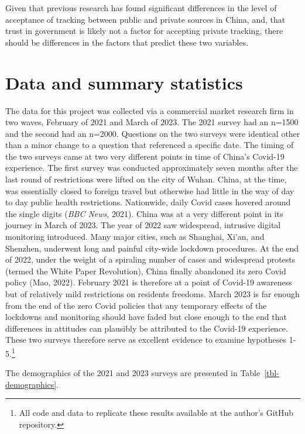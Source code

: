\documentclass[
  letterpaper,
  DIV=11,
  numbers=noendperiod]{scrartcl}
\begin{document}
Given that previous research has found significant differences in the
level of acceptance of tracking between public and private sources in
China, and, that trust in government is likely not a factor for
accepting private tracking, there should be differences in the factors
that predict these two variables.

\section{Data and summary statistics}\label{sec-datasummary}

The data for this project was collected via a commercial market research
firm in two waves, February of 2021 and March of 2023. The 2021 survey
had an n=1500 and the second had an n=2000. Questions on the two surveys
were identical other than a minor change to a question that referenced a
specific date. The timing of the two surveys came at two very different
points in time of China's Covid-19 experience. The first survey was
conducted approximately seven months after the last round of
restrictions were lifted on the city of Wuhan. China, at the time, was
essentially closed to foreign travel but otherwise had little in the way
of day to day public health restrictions. Nationwide, daily Covid cases
hovered around the single digits (\emph{BBC News}, 2021). China was at a
very different point in its journey in March of 2023. The year of 2022
saw widespread, intrusive digital monitoring introduced. Many major
cities, such as Shanghai, Xi'an, and Shenzhen, underwent long and
painful city-wide lockdown procedures. At the end of 2022, under the
weight of a spiraling number of cases and widespread protests (termed
the White Paper Revolution), China finally abandoned its zero Covid
policy (Mao, 2022). February 2021 is therefore at a point of Covid-19
awareness but of relatively mild restrictions on residents freedoms.
March 2023 is far enough from the end of the zero Covid policies that
any temporary effects of the lockdowns and monitoring should have faded
but close enough to the end that differences in attitudes can plausibly
be attributed to the Covid-19 experience. These two surveys therefore
serve as excellent evidence to examine hypotheses 1-5.\footnote{All code
  and data to replicate these results available at the author's GitHub
  repository.}

The demographics of the 2021 and 2023 surveys are presented in
Table~\ref{tbl-demographics}.
\end{document}
